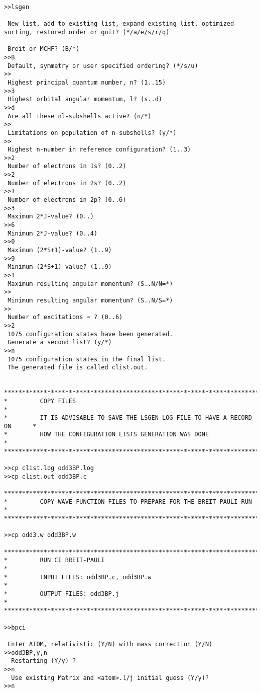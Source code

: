 \documentclass[fleqn,10pt]{book}
\begin{document}
\begin{verbatim}
>>lsgen

 New list, add to existing list, expand existing list, optimized sorting, restored order or quit? (*/a/e/s/r/q)

 Breit or MCHF? (B/*)
>>B
 Default, symmetry or user specified ordering? (*/s/u)
>>
 Highest principal quantum number, n? (1..15)
>>3
 Highest orbital angular momentum, l? (s..d)
>>d
 Are all these nl-subshells active? (n/*)
>>
 Limitations on population of n-subshells? (y/*)
>>
 Highest n-number in reference configuration? (1..3)
>>2
 Number of electrons in 1s? (0..2)
>>2
 Number of electrons in 2s? (0..2)
>>1
 Number of electrons in 2p? (0..6)
>>3
 Maximum 2*J-value? (0..)
>>6
 Minimum 2*J-value? (0..4)
>>0
 Maximum (2*S+1)-value? (1..9)
>>9
 Minimum (2*S+1)-value? (1..9)
>>1
 Maximum resulting angular momentum? (S..N/N=*)
>>
 Minimum resulting angular momentum? (S..N/S=*)
>>
 Number of excitations = ? (0..6)
>>2
 1075 configuration states have been generated.
 Generate a second list? (y/*)
>>n
 1075 configuration states in the final list.
 The generated file is called clist.out.


*******************************************************************************
*         COPY FILES                                                          *
*         IT IS ADVISABLE TO SAVE THE LSGEN LOG-FILE TO HAVE A RECORD ON      *
*         HOW THE CONFIGURATION LISTS GENERATION WAS DONE                     *
*******************************************************************************

>>cp clist.log odd3BP.log
>>cp clist.out odd3BP.c

*******************************************************************************
*         COPY WAVE FUNCTION FILES TO PREPARE FOR THE BREIT-PAULI RUN         *
*******************************************************************************

>>cp odd3.w odd3BP.w

*******************************************************************************
*         RUN CI BREIT-PAULI                                                  *
*         INPUT FILES: odd3BP.c, odd3BP.w                                     *
*         OUTPUT FILES: odd3BP.j                                              *
*******************************************************************************

>>bpci

 Enter ATOM, relativistic (Y/N) with mass correction (Y/N)
>>odd3BP,y,n
  Restarting (Y/y) ?
>>n
  Use existing Matrix and <atom>.l/j initial guess (Y/y)?
>>n


\end{verbatim}
\end{document}
